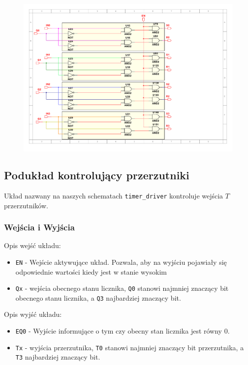 \documentclass[a4paper]{article}
\begin{document}
\begin{figure}[H]
    \centering
    \includegraphics[width=\textwidth]{timer_setter_subsheet.pdf}
\end{figure}

\pagebreak
\subsection{Podukład kontrolujący przerzutniki}
Układ nazwany na naszych schematach \verb|timer_driver| kontroluje wejścia $T$ przerzutników.


\subsubsection{Wejścia i Wyjścia}
Opis wejść układu:
\begin{itemize}
    \item \verb|EN| - Wejście aktywujące układ. Pozwala, aby na wyjściu pojawiały się odpowiednie wartości kiedy jest w stanie wysokim
    \item \verb|Qx| - wejścia obecnego stanu licznika, \verb|Q0| stanowi najmniej znaczący bit obecnego stanu licznika,
            a \verb|Q3| najbardziej znaczący bit.
\end{itemize}

Opis wyjść układu:

\begin{itemize}
    \item \verb|EQ0| - Wyjście informujące o tym czy obecny stan licznika jest równy 0.
    \item \verb|Tx| - wyjścia przerzutnika, \verb|T0| stanowi najmniej znaczący bit przerzutnika,
    a \verb|T3| najbardziej znaczący bit.
\end{itemize}
\end{document}
